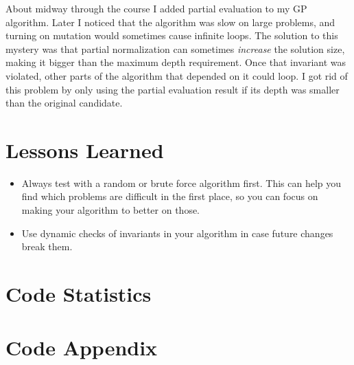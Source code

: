 \documentclass{article}
\begin{document}
About midway through the course I added partial evaluation to my GP
algorithm. Later I noticed that the algorithm was slow on large
problems, and turning on mutation would sometimes cause infinite
loops. The solution to this mystery was that partial normalization can
sometimes \textit{increase} the solution size, making it bigger than
the maximum depth requirement. Once that invariant was violated, other
parts of the algorithm that depended on it could loop. I got rid of
this problem by only using the partial evaluation result if its depth
was smaller than the original candidate.

\section{Lessons Learned}

\begin{itemize}
\item Always test with a random or brute force algorithm first. This can
help you find which problems are difficult in the first place, so you
can focus on making your algorithm to better on those.
\item Use dynamic checks of invariants in your algorithm in case future
changes break them.
\end{itemize}

\section{Code Statistics}

\section{Code Appendix}


\end{document}
